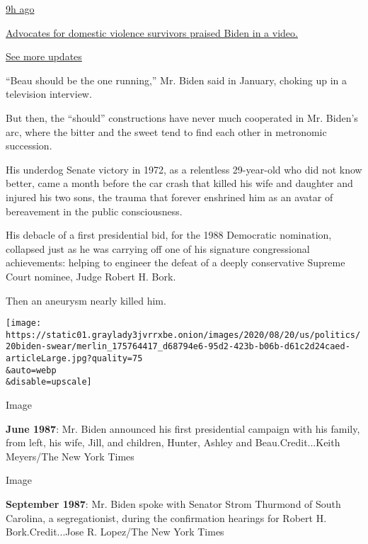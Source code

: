 \href{https://www.nytimes3xbfgragh.onion/live/2020/08/19/us/dnc-convention-election?action=click\&pgtype=Article\&state=default\&region=MAIN_CONTENT_1\&context=storylines_live_updates\#advocates-for-domestic-violence-survivors-praised-biden-in-a-video}{9h
ago}

\href{https://www.nytimes3xbfgragh.onion/live/2020/08/19/us/dnc-convention-election?action=click\&pgtype=Article\&state=default\&region=MAIN_CONTENT_1\&context=storylines_live_updates\#advocates-for-domestic-violence-survivors-praised-biden-in-a-video}{Advocates
for domestic violence survivors praised Biden in a video.}

\href{https://www.nytimes3xbfgragh.onion/live/2020/08/19/us/dnc-convention-election?action=click\&pgtype=Article\&state=default\&region=MAIN_CONTENT_1\&context=storylines_live_updates}{See
more updates}

``Beau should be the one running,'' Mr. Biden said in January, choking
up in a television interview.

But then, the ``should'' constructions have never much cooperated in Mr.
Biden's arc, where the bitter and the sweet tend to find each other in
metronomic succession.

His underdog Senate victory in 1972, as a relentless 29-year-old who did
not know better, came a month before the car crash that killed his wife
and daughter and injured his two sons, the trauma that forever enshrined
him as an avatar of bereavement in the public consciousness.

His debacle of a first presidential bid, for the 1988 Democratic
nomination, collapsed just as he was carrying off one of his signature
congressional achievements: helping to engineer the defeat of a deeply
conservative Supreme Court nominee, Judge Robert H. Bork.

Then an aneurysm nearly killed him.

\texttt{[image: https://static01.graylady3jvrrxbe.onion/images/2020/08/20/us/politics/20biden-swear/merlin\_175764417\_d68794e6-95d2-423b-b06b-d61c2d24caed-articleLarge.jpg?quality=75\\\&auto=webp\\\&disable=upscale]}

Image

\textbf{June 1987}: Mr. Biden announced his first presidential campaign
with his family, from left, his wife, Jill, and children, Hunter, Ashley
and Beau.Credit...Keith Meyers/The New York Times

Image

\textbf{September 1987}: Mr. Biden spoke with Senator Strom Thurmond of
South Carolina, a segregationist, during the confirmation hearings for
Robert H. Bork.Credit...Jose R. Lopez/The New York Times

